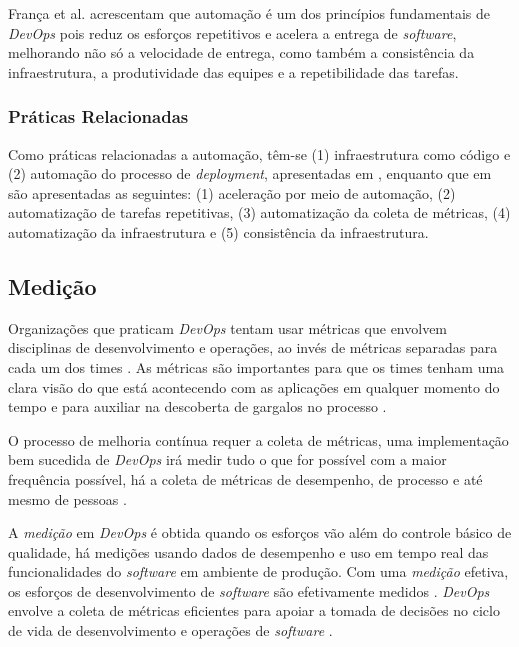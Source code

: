 França et al. \cite{characterizing_devops} acrescentam que automação é um dos
princípios fundamentais de \textit{DevOps} pois reduz os esforços repetitivos
e acelera a entrega de \textit{software}, melhorando não só a velocidade de
entrega, como também a consistência da infraestrutura, a produtividade das
equipes e a repetibilidade das tarefas.

\subsubsection{Práticas Relacionadas}

Como práticas relacionadas a automação, têm-se (1) infraestrutura como código
e (2) automação do processo de \textit{deployment}, apresentadas em
\cite{extending_dimensions}, enquanto que em \cite{characterizing_devops} são
apresentadas as seguintes: (1) aceleração por meio de automação, (2)
automatização de tarefas repetitivas, (3) automatização da coleta de métricas,
(4) automatização da infraestrutura e (5) consistência da infraestrutura.

\subsection{Medição}

Organizações que praticam \textit{DevOps} tentam usar métricas que envolvem
disciplinas de desenvolvimento e operações, ao invés de métricas separadas
para cada um dos times \cite{qualitative_devops_journalsw_17}. As métricas são
importantes para que os times tenham uma clara visão do que está acontecendo
com as aplicações em qualquer momento do tempo e para auxiliar na descoberta
de gargalos no processo \cite{challenges_in_adopting_devops}.

O processo de melhoria contínua requer a coleta de métricas, uma implementação
bem sucedida de \textit{DevOps} irá medir tudo o que for possível com a maior
frequência possível, há a coleta de métricas de desempenho, de processo e até
mesmo de pessoas \cite{what_devops_means_2010}.

A \emph{medição} em \textit{DevOps} é obtida quando os esforços vão além do
controle básico de qualidade, há medições usando dados de desempenho e uso em
tempo real das funcionalidades do \textit{software} em ambiente de produção.
Com uma \emph{medição} efetiva, os esforços de desenvolvimento de
\textit{software} são efetivamente medidos \cite{dimensions_of_devops}. \textit{DevOps}
envolve a coleta de métricas eficientes para apoiar a tomada de decisões no
ciclo de vida de desenvolvimento e operações de \textit{software} \cite{characterizing_devops}.

